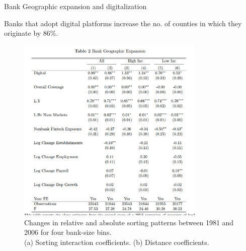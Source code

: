 \documentclass[notes,10pt, aspectratio=169]{beamer}
\newenvironment{wideitemize}{\itemize\addtolength{\itemsep}{10pt}}{\enditemize}
\begin{document}
    

\begin{frame}{Bank Geographic expansion and digitalization}

\begin{wideitemize}
\item Banks that adopt digital platforms increase the no. of counties in which they originate by 86\%.
\end{wideitemize}
\begin{figure}
\centering
\includegraphics[width=0.8\textwidth]{imgs/tab2.png}
\caption*{Changes in relative and absolute sorting patterns between 1981 and 2006 for
four bank-size bins.\\ (a) Sorting interaction coefficients. (b) Distance coefficients.}
\label{fig:my_label}
\end{figure}





\end{frame}
\end{document}
